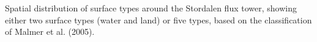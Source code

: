 \label{fig:r_water_land} Spatial distribution of surface types
around the Stordalen flux tower, showing either two surface types (water
and land) or five types, based on the classification of Malmer et al.
(2005).
